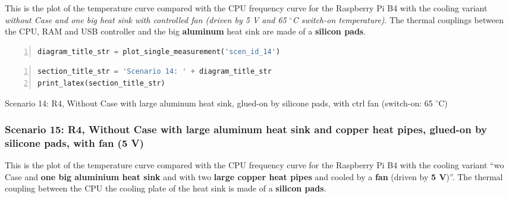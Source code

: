 \documentclass[10pt,parskip=half,
toc=sectionentrywithdots,
bibliography=totocnumbered,
captions=tableheading,numbers=noendperiod]{scrartcl}
\begin{document}
This is the plot of the temperature curve compared with the CPU
frequency curve for the Raspberry Pi B4 with the cooling variant
\emph{without Case and one big heat sink with controlled fan (driven by
5 V and 65 \(^\circ\)C switch-on temperature)}. The thermal couplings
between the CPU, RAM and USB controller and the big \textbf{aluminum}
heat sink are made of a \textbf{silicon pads}.

\begin{lstlisting}[language=Python,numbers=left,xleftmargin=20pt,xrightmargin=5pt,belowskip=5pt,aboveskip=5pt]
diagram_title_str = plot_single_measurement('scen_id_14')
\end{lstlisting}

\begin{figure}[H]\begin{center}\end{center}\end{figure}

\begin{lstlisting}[language=Python,numbers=left,xleftmargin=20pt,xrightmargin=5pt,belowskip=5pt,aboveskip=5pt]
section_title_str = 'Scenario 14: ' + diagram_title_str
print_latex(section_title_str)
\end{lstlisting}

\begin{table}[H]
\centering
\begin{adjustbox}{max width=\textwidth}
Scenario 14: R4, Without Case with large aluminum heat sink, glued-on by silicone pads, with ctrl fan (switch-on: 65 $^\circ$C)
\end{adjustbox}
\end{table}

\hypertarget{scenario-15-r4-without-case-with-large-aluminum-heat-sink-and-copper-heat-pipes-glued-on-by-silicone-pads-with-fan-5-v}{%
\subsubsection{Scenario 15: R4, Without Case with large aluminum heat
sink and copper heat pipes, glued-on by silicone pads, with fan (5
V)}\label{scenario-15-r4-without-case-with-large-aluminum-heat-sink-and-copper-heat-pipes-glued-on-by-silicone-pads-with-fan-5-v}}

This is the plot of the temperature curve compared with the CPU
frequency curve for the Raspberry Pi B4 with the cooling variant ``wo
Case and \textbf{one big aluminium heat sink} and with two \textbf{large
copper heat pipes} and cooled by a \textbf{fan} (driven by \textbf{5
V})''. The thermal coupling between the CPU the cooling plate of the
heat sink is made of a \textbf{silicon pads}.
\end{document}
